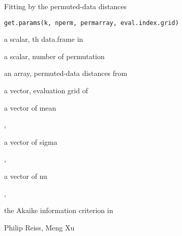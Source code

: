 \documentclass[a4paper]{book}
\begin{document}
%
\begin{Description}\relax
Fitting by the permuted-data distances
\end{Description}
%
\begin{Usage}
\begin{verbatim}
get.params(k, nperm, permarray, eval.index.grid)
\end{verbatim}
\end{Usage}
%
\begin{Arguments}
\begin{ldescription}
\item[\code{k}] a scalar, th data.frame in 

\item[\code{nperm}] a scalar, number of permutation

\item[\code{permarray}] an array, permuted-data distances from 

\item[\code{eval.index.grid}] a vector, evaluation grid of 
\end{ldescription}
\end{Arguments}
%
\begin{Value}
\begin{ldescription}
\item[\code{mu}] a vector of mean\end{ldescription}
, \begin{ldescription}
\item[\code{sigma}] a vector of sigma\end{ldescription}
, 
\begin{ldescription}
\item[\code{nu}] a vector of nu\end{ldescription}
, \begin{ldescription}
\item[\code{aic}] the Akaike information criterion in 
\end{ldescription}
\end{Value}
%
\begin{Author}\relax
Philip Reiss, Meng Xu
\end{Author}
%
\begin{SeeAlso}\relax
{}
\end{SeeAlso}
\end{document}
